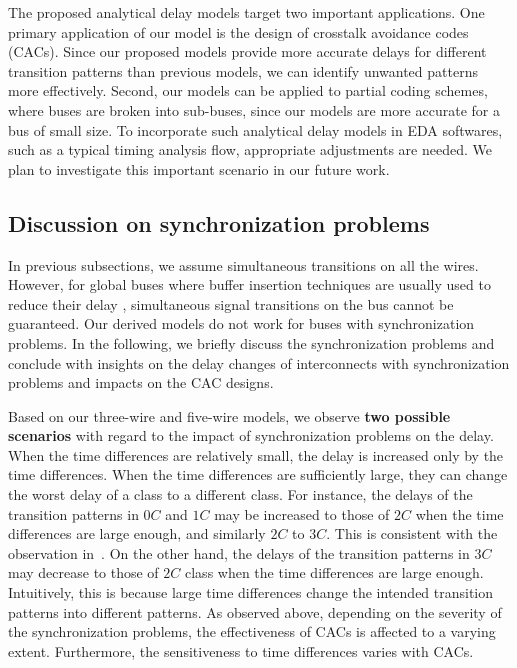 \documentclass[10pt,journal]{IEEEtran}
\begin{document}
The proposed analytical delay models target two important applications. One primary application of our model is the design of crosstalk avoidance codes (CACs). Since our proposed models provide more accurate delays for different transition patterns than previous models, we can identify unwanted patterns more effectively. Second, our models can be applied to partial coding schemes, where buses are broken into sub-buses, since our models are more accurate for a bus of small size.
To incorporate such analytical delay models in EDA softwares, such as a typical timing analysis flow, appropriate adjustments are needed. We plan to investigate this important scenario in our future work.







\subsection{Discussion on synchronization problems}
\label{sec:sync}

In previous subsections, we assume simultaneous transitions on all the wires. However, for global buses where buffer insertion techniques are usually used to reduce their delay \cite{Tsa06}, simultaneous signal transitions on the bus cannot be guaranteed. Our derived models do not work for buses with synchronization problems.
In the following, we briefly discuss the synchronization problems and conclude with insights on the delay changes of interconnects with synchronization problems and impacts on the CAC designs.

Based on our three-wire and five-wire models, we observe \textbf{two possible scenarios} with regard to the impact of synchronization problems on the delay. When the time differences are relatively small, the delay is increased only by the time differences. When the time differences are sufficiently large, they can change the worst delay of a class to a different class. For instance, the delays of the transition patterns in $0C$ and $1C$ may be increased to those of $2C$ when the time differences are large enough, and similarly $2C$ to $3C$. This is consistent with the observation in~\cite{Dua04}. On the other hand, the delays of the transition patterns in $3C$ may decrease to those of $2C$ class when the time differences are large enough. Intuitively, this is because large time differences change the intended transition patterns into different patterns.
As observed above, depending on the severity of the synchronization problems, the effectiveness of CACs is affected to a varying extent. Furthermore, the sensitiveness to time differences varies with CACs.
\end{document}
